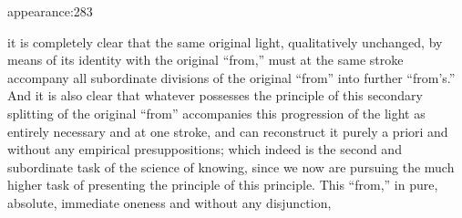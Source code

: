 appearance:283

it is completely clear that the same original light,
qualitatively unchanged,
by means of its identity with the original “from,”
must at the same stroke accompany
all subordinate divisions of
the original “from” into
further “from’s.”
And it is also clear that whatever possesses
the principle of this secondary splitting
of the original “from” accompanies
this progression of the light
as entirely necessary and at one stroke,
and can reconstruct it purely a priori
and without any empirical presuppositions;
which indeed is the second and subordinate task
of the science of knowing,
since we now are pursuing the much higher task
of presenting the principle of this principle.
This “from,” in pure, absolute, immediate oneness
and without any disjunction,
